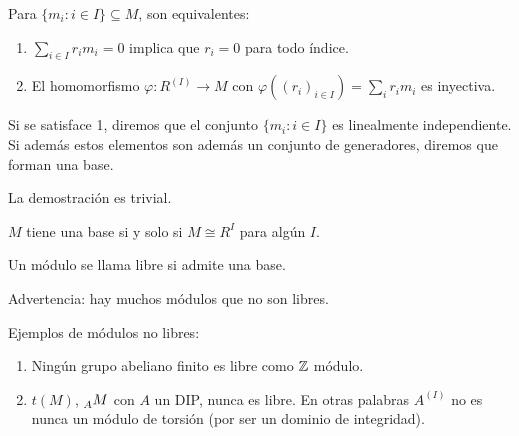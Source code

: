 \begin{lema}[]
  Para \(\{m_i:i\in I\}\subseteq M\), son equivalentes:
  \begin{enumerate}
    \item \(\sum_{i\in I} r_i m_i=0\) implica que \(r_i=0\) para todo índice.
    \item El homomorfismo \(\varphi:R^{(I)}\longrightarrow M\) con
      \(\varphi({(r_i)}_{i\in I})=\sum_i r_i m_i\) es inyectiva.
  \end{enumerate}
  Si se satisface 1, diremos que el conjunto \(\{m_i:i\in I\}\) es linealmente
  independiente. Si además estos elementos son además un conjunto de
  generadores, diremos que forman una base.
\end{lema}

La demostración es trivial.

\begin{obs}
  \(M\) tiene una base si y solo si \(M\cong R^I\) para algún \(I\).
\end{obs}

\begin{df}
  Un módulo se llama libre si admite una base.
\end{df}

\begin{obs}
  Advertencia: hay muchos módulos que no son libres.
\end{obs}

Ejemplos de módulos no libres:
\begin{enumerate}
  \item Ningún grupo abeliano finito es libre como \(\mathbb{Z}\) módulo.
  \item \(t(M)\), \(\prescript{}{A}{M}\) con \(A\) un DIP, nunca es libre.
    En otras palabras \(A^{(I)}\) no es nunca un módulo de torsión (por
    ser un dominio de integridad).
\end{enumerate}
